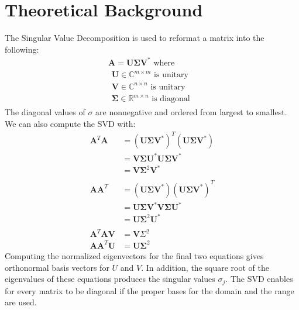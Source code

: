 \documentclass{article}
\begin{document}
\section*{\fontsize{19}{15}\selectfont Theoretical Background}
	The Singular Value Decomposition is used to reformat a matrix into the following: 
	\begin{align*}
\mathbf { A } = \mathbf { U } \boldsymbol { \Sigma } \mathbf { V } ^ { * } \text{ where} \\
\begin{array} { l } { \mathbf { U } \in \mathbb { C } ^ { m \times m } \text { is unitary } } \\ { \mathbf { V } \in \mathbb { C } ^ { n \times n } \text { is unitary } } \\ { \boldsymbol { \Sigma } \in \mathbb { R } ^ { m \times n } \text { is diagonal } } \end{array}
	\end{align*}
	The diagonal values of $\sigma$ are nonnegative and ordered from largest to smallest. We can also compute the SVD with: 
\begin{align*}
\mathbf { A } ^ { T } \mathbf { A } & = \left( \mathbf { U } \boldsymbol { \Sigma } \mathbf { V } ^ { * } \right) ^ { T } \left( \mathbf { U } \boldsymbol { \Sigma } \mathbf { V } ^ { * } \right) \\ & = \mathbf { V } \boldsymbol { \Sigma } \mathbf { U } ^ { * } \mathbf { U } \boldsymbol { \Sigma } \mathbf { V } ^ { * } \\ & = \mathbf { V } \boldsymbol { \Sigma } ^ { 2 } \mathbf { V } ^ { * }  \\ \\
\mathbf { A } \mathbf { A } ^ { T } & = \left( \mathbf { U } \boldsymbol { \Sigma } \mathbf { V } ^ { * } \right) \left( \mathbf { U } \boldsymbol { \Sigma } \mathbf { V } ^ { * } \right) ^ { T } \\ & = \mathbf { U \Sigma V } ^ { * } \mathbf { V } \boldsymbol { \Sigma } \mathbf { U } ^ { * } \\ & = \mathbf { U } \boldsymbol { \Sigma } ^ { 2 } \mathbf { U } ^ { * } \\ \\
\mathbf { A } ^ { T } \mathbf { A V } & = \mathbf { V } \Sigma ^ { 2 } \\ \mathbf { A } \mathbf { A } ^ { T } \mathbf { U } & = \mathbf { U } \boldsymbol { \Sigma } ^ { 2 }
\end{align*}
Computing the normalized eigenvectors for the final two equations gives orthonormal basis vectors for $U$ and $V$. In addition, the square root of the eigenvalues of these equations produces the singular values $\sigma_j$. The SVD enables for every matrix to be diagonal if the proper bases for the domain and the range are used.
\end{document}
